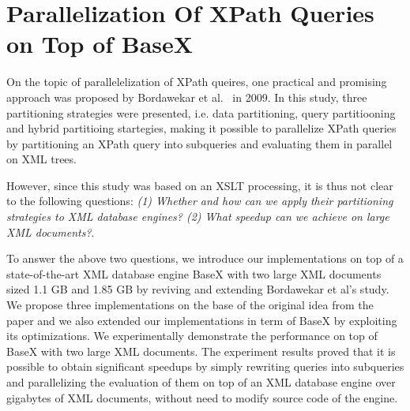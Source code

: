 \newcommand{\Placeholder}[1]{$\langle\!\langle\mbox{\textrm{#1}}\rangle\!\rangle$}
\newcommand{\bfn}[1]{\textup{#1}}
\newcommand{\Src}[1]{\texttt{#1}}
\newcommand{\fn}[1]{\mathit{#1}}
\newcommand{\modify}[3]{{\underline{\sf{#1}}:} {\color{blue}{#2}} {\color{green}{\mbox{$\Rightarrow$}}} {\color{red}{#3}}}
\newcommand{\todo}[2]{{\underline{\textsf{#1}}:} {\color{red}{$\spadesuit$#2$\spadesuit$}}}
\newcommand{\hack}{{\color{red}{$\blacklozenge$}}}


\chapter{Parallelization Of XPath Queries on Top of BaseX}

On the topic of parallelelization of XPath queires, one practical and promising
approach was proposed by Bordawekar et al.~\cite{Bord10} in 2009. In this study,
three partitioning strategies were presented, i.e. data partitioning, query
partitiooning  and hybrid partitioing startegies,  making it possible to
parallelize XPath queries by partitioning an XPath query into subqueries and
evaluating them in parallel on XML trees.

However, since this study was based on an XSLT processing, it is thus not clear
to the following questions: \textit{(1) Whether and how can we apply their
partitioning strategies to XML database engines? (2) What speedup can we achieve
on large XML documents?}.

To answer the above two questions, we introduce our implementations on top of a
state-of-the-art XML database engine BaseX with two large XML documents sized 
1.1 GB and 1.85 GB by reviving and extending Bordawekar et al's study. We propose
three implementations on the base of the original idea from the paper and we also
extended our implementations in term of BaseX by exploiting its optimizations.
We experimentally demonstrate the performance on top of BaseX with two large 
XML documents. The experiment results proved that it is
possible to obtain significant speedups by simply rewriting queries into
subqueries and parallelizing the evaluation of them on top of an XML database
engine over gigabytes of XML documents, without need to modify source code of the engine.

%












